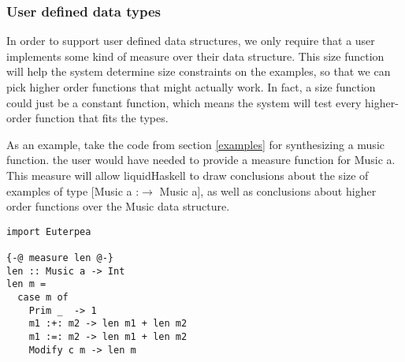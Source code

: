 \subsubsection{User defined data types}
In order to support user defined data structures, we only require that a user implements some kind of measure\cite{realWorldLiquid} over their data structure.
This size function will help the system determine size constraints on the examples, so that we can pick higher order functions that might actually work.
In fact, a size function could just be a constant function, which means the system will test every higher-order function that fits the types. 

As an example, take the code from section \ref{examples} for synthesizing a music function.
the user would have needed to provide a measure function for Music a.
This measure will allow liquidHaskell to draw conclusions about the size of examples of type [Music a :$\to$ Music a], as well as conclusions about higher order functions over the Music data structure.

\begin{lstlisting}
import Euterpea

{-@ measure len @-}
len :: Music a -> Int
len m =
  case m of
    Prim _  -> 1
    m1 :+: m2 -> len m1 + len m2
    m1 :=: m2 -> len m1 + len m2
    Modify c m -> len m
\end{lstlisting}



